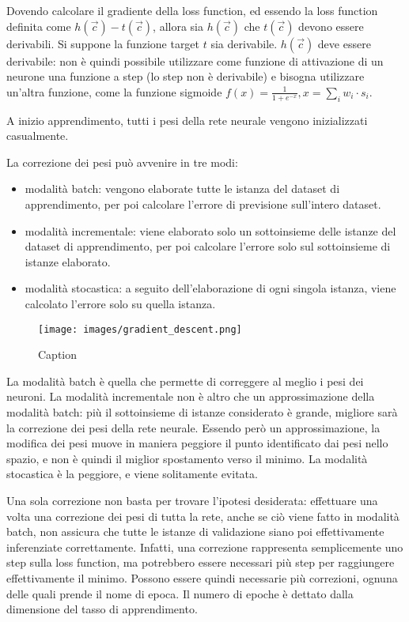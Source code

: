 Dovendo calcolare il gradiente della loss function, ed essendo la loss function definita come $h(\Vec{c}) - t(\Vec{c})$, allora sia $h(\Vec{c})$ che $t(\Vec{c})$ devono essere derivabili. Si suppone la funzione target $t$ sia derivabile. $h(\Vec{c})$ deve essere derivabile: non è quindi possibile utilizzare come funzione di attivazione di un neurone una funzione a step (lo step non è derivabile) e bisogna utilizzare un'altra funzione, come la funzione sigmoide $f(x) = \frac{1}{1+e^{-x}}, x = \sum_i w_i \cdot s_i$.

A inizio apprendimento, tutti i pesi della rete neurale vengono inizializzati casualmente.

La correzione dei pesi può avvenire in tre modi:
\begin{itemize}
    \item modalità batch: vengono elaborate tutte le istanza del dataset di apprendimento, per poi calcolare l'errore di previsione sull'intero dataset.
    \item modalità incrementale: viene elaborato solo un sottoinsieme delle istanze del dataset di apprendimento, per poi calcolare l'errore solo sul sottoinsieme di istanze elaborato.
    \item modalità stocastica: a seguito dell'elaborazione di ogni singola istanza, viene calcolato l'errore solo su quella istanza.
\end{itemize}
\begin{figure}
    \centering
    \texttt{[image: images/gradient\_descent.png]}
    \caption{Caption}
    \label{fig:gradient_descent}
\end{figure}
La modalità batch è quella che permette di correggere al meglio i pesi dei neuroni. La modalità incrementale non è altro che un approssimazione della modalità batch: più il sottoinsieme di istanze considerato è grande, migliore sarà la correzione dei pesi della rete neurale. Essendo però un approssimazione, la modifica dei pesi muove in maniera peggiore il punto identificato dai pesi nello spazio, e non è quindi il miglior spostamento verso il minimo.
La modalità stocastica è la peggiore, e viene solitamente evitata.

Una sola correzione non basta per trovare l'ipotesi desiderata: effettuare una volta una correzione dei pesi di tutta la rete, anche se ciò viene fatto in modalità batch, non assicura che tutte le istanze di validazione siano poi effettivamente inferenziate correttamente.
Infatti, una correzione rappresenta semplicemente uno step sulla loss function, ma potrebbero essere necessari più step per raggiungere effettivamente il minimo.
Possono essere quindi necessarie più correzioni, ognuna delle quali prende il nome di epoca.
Il numero di epoche è dettato dalla dimensione del tasso di apprendimento.


